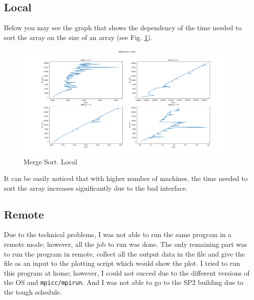 \documentclass{article}
\begin{document}
	\subsection{Local}
		Below you may see the graph that shows the dependency of the time needed to sort the array on the size of an array (see Fig. \ref{fig:merge_local}).
		\begin{figure}[htbp]
    		\centering
    		\includegraphics[width=\textwidth]{merge_local.png}
    		\caption{Merge Sort. Local}
    		\label{fig:merge_local}
		\end{figure}
		
		It can be easily noticed that with higher number of machines, the time needed to sort the array increases significantly due to the bad interface.
	
	\subsection{Remote}
		Due to the technical problems, I was not able to run the same program in a remote mode; however, all the job to run was done. The only remaining part was to run the program in remote, collect all the output data in the file and give the file as an input to the plotting script which would show the plot. I tried to run this program at home; however, I could not succed due to the different versions of the OS and \texttt{mpicc/mpirun}. And I was not able to go to the SP2 building due to the tough schedule.
		
		
		
		
		
		
		
\end{document}
